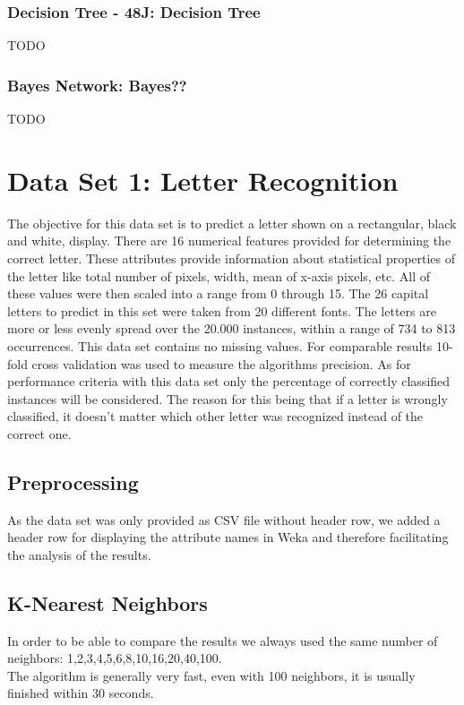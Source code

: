 \documentclass{sig-alternate-05-2015}
\begin{document}
\subsubsection{Decision Tree - 48J: Decision Tree}
TODO\\
\subsubsection{Bayes Network: Bayes??}
TODO\\


\section{Data Set 1: Letter Recognition}
The objective for this data set is to predict a letter shown on a rectangular, black and white, display. There are 16 numerical features  provided for determining the correct letter. These attributes provide information about statistical properties of the letter like total number of pixels, width, mean of x-axis pixels, etc.
All of these values were then scaled into a range from 0 through 15. The 26 capital letters to predict in this set were taken from 20 different fonts. The letters are more or less evenly spread over the 20.000 instances, within a range of 734 to 813 occurrences. This data set contains no missing values. For comparable results 10-fold cross validation was used to measure the algorithms precision.
As for performance criteria with this data set only the percentage of correctly classified instances will be considered. The reason for this being that if a letter is wrongly classified, it doesn't matter which other letter was recognized instead of the correct one. 
\\
\subsection{Preprocessing}
As the data set was only provided as CSV file without header row, we added a header row for displaying the attribute names in Weka and therefore facilitating the analysis of the results. 
\\
\subsection{K-Nearest Neighbors}
In order to be able to compare the results we always used the same number of neighbors: 1,2,3,4,5,6,8,10,16,20,40,100.\\
The algorithm is generally very fast, even with 100 neighbors, it is usually finished within 30 seconds. 
\end{document}
